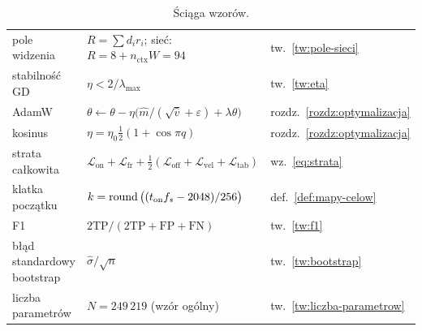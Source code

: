 \begin{table}[ht]
\begin{tabular}{@{}p{3.6cm}p{6.4cm}p{1.4cm}@{}}
pole widzenia & $R=\sum d_ir_i$; sieć: $R=8+n_\mathrm{ctx}W=94$ & tw.~\ref{tw:pole-sieci}\\
stabilność GD & $\eta<2/\lambda_{\max}$ & tw.~\ref{tw:eta}\\
AdamW & $\theta\leftarrow\theta-\eta\big(\hat m/(\sqrt{\hat v}+\varepsilon)+\lambda\theta\big)$ & rozdz.~\ref{rozdz:optymalizacja}\\
kosinus & $\eta=\eta_0\tfrac12(1+\cos\pi q)$ & rozdz.~\ref{rozdz:optymalizacja}\\
strata całkowita & $\mathcal L_\mathrm{on}+\mathcal L_\mathrm{fr}+\tfrac12(\mathcal L_\mathrm{off}+\mathcal L_\mathrm{vel}+\mathcal L_\mathrm{tab})$ & wz.~\eqref{eq:strata}\\
klatka początku & $k=\operatorname{round}\big((t_\mathrm{on}f_s-2048)/256\big)$ & def.~\ref{def:mapy-celow}\\
F1 & $2\mathrm{TP}/(2\mathrm{TP}+\mathrm{FP}+\mathrm{FN})$ & tw.~\ref{tw:f1}\\
błąd standardowy bootstrap & $\hat\sigma/\sqrt n$ & tw.~\ref{tw:bootstrap}\\
liczba parametrów & $N=249\,219$ (wzór ogólny) & tw.~\ref{tw:liczba-parametrow}\\
\bottomrule
\end{tabular}
\caption{Ściąga wzorów.}
\label{tab:sciaga}
\end{table}
